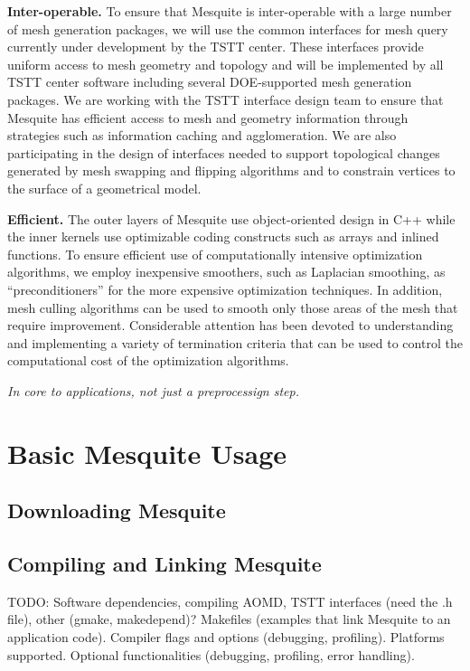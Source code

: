 \documentclass[psfig]{article}
\begin{document}
{\bf Inter-operable.}  To ensure that Mesquite is inter-operable with a
large number of mesh generation packages, we will use the common
interfaces for mesh query currently under development by the TSTT
center.  These interfaces provide uniform access to mesh geometry and
topology and will be implemented by all TSTT center software including
several DOE-supported mesh generation packages.  We are working with
the TSTT interface design team to ensure that Mesquite has efficient
access to mesh and geometry information through strategies such as
information caching and agglomeration.  We are also participating in
the design of interfaces needed to support topological changes
generated by mesh swapping and flipping algorithms and to constrain
vertices to the surface of a geometrical model.


{\bf Efficient.}  The outer layers of Mesquite use 
object-oriented design in C++ while the inner kernels use
optimizable coding constructs such as arrays and inlined
functions.  To ensure efficient use of computationally intensive
optimization algorithms, we employ inexpensive smoothers, such as
Laplacian smoothing, as ``preconditioners'' for the more expensive
optimization techniques.  In addition, mesh culling algorithms can be
used to smooth only those areas of the mesh that require improvement.
Considerable attention has been devoted to understanding and
implementing a variety of termination criteria that can be used to
control the computational cost of the optimization algorithms.

{\it In core to applications, not just a preprocessign step.}

\section{Basic Mesquite Usage}

\subsection{Downloading Mesquite}

\subsection{Compiling and Linking Mesquite}
TODO:  Software dependencies, compiling AOMD, TSTT interfaces
(need the .h file),
other (gmake, makedepend)?  Makefiles (examples that link Mesquite to an 
application code). Compiler flags and options (debugging, profiling). 
Platforms supported. Optional functionalities (debugging, profiling, 
error handling).
\end{document}
